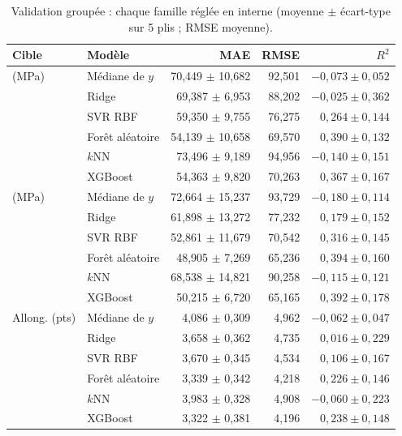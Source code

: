 \begin{table}[htbp]
\centering
\small
\caption{Validation groupée : chaque famille réglée en interne (moyenne $\pm$
écart-type sur 5 plis ; RMSE moyenne).}
\label{tab:annexe_groupee}
\begin{tabular}{@{}l l r r r@{}}
\toprule
Cible & Modèle & MAE & RMSE & $R^2$ \\
\midrule
\YS{} (MPa) & Médiane de $y$  & 70,449 $\pm$ 10,682 & 92,501 & $-0{,}073 \pm 0{,}052$ \\
            & Ridge           & 69,387 $\pm$ 6,953  & 88,202 & $-0{,}025 \pm 0{,}362$ \\
            & SVR RBF         & 59,350 $\pm$ 9,755  & 76,275 & $0{,}264 \pm 0{,}144$ \\
            & Forêt aléatoire & 54,139 $\pm$ 10,658 & 69,570 & $0{,}390 \pm 0{,}132$ \\
            & $k$NN           & 73,496 $\pm$ 9,189  & 94,956 & $-0{,}140 \pm 0{,}151$ \\
            & XGBoost         & 54,363 $\pm$ 9,820  & 70,263 & $0{,}367 \pm 0{,}167$ \\
\midrule
\UTS{} (MPa) & Médiane de $y$ & 72,664 $\pm$ 15,237 & 93,729 & $-0{,}180 \pm 0{,}114$ \\
             & Ridge          & 61,898 $\pm$ 13,272 & 77,232 & $0{,}179 \pm 0{,}152$ \\
             & SVR RBF        & 52,861 $\pm$ 11,679 & 70,542 & $0{,}316 \pm 0{,}145$ \\
             & Forêt aléatoire & 48,905 $\pm$ 7,269 & 65,236 & $0{,}394 \pm 0{,}160$ \\
             & $k$NN          & 68,538 $\pm$ 14,821 & 90,258 & $-0{,}115 \pm 0{,}121$ \\
             & XGBoost        & 50,215 $\pm$ 6,720  & 65,165 & $0{,}392 \pm 0{,}178$ \\
\midrule
Allong. (pts) & Médiane de $y$ & 4,086 $\pm$ 0,309 & 4,962 & $-0{,}062 \pm 0{,}047$ \\
              & Ridge          & 3,658 $\pm$ 0,362 & 4,735 & $0{,}016 \pm 0{,}229$ \\
              & SVR RBF        & 3,670 $\pm$ 0,345 & 4,534 & $0{,}106 \pm 0{,}167$ \\
              & Forêt aléatoire & 3,339 $\pm$ 0,342 & 4,218 & $0{,}226 \pm 0{,}146$ \\
              & $k$NN          & 3,983 $\pm$ 0,328 & 4,908 & $-0{,}060 \pm 0{,}223$ \\
              & XGBoost        & 3,322 $\pm$ 0,381 & 4,196 & $0{,}238 \pm 0{,}148$ \\

\end{tabular}
\end{table}
